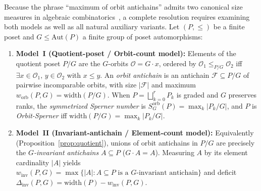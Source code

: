 \documentclass[11pt,a4paper]{article}
\theoremstyle{definition}
\newcommand{\Aut}{\mathrm{Aut}}
\newcommand{\width}{\mathrm{width}}
\newcommand{\worb}{w_{\mathrm{orb}}}
\newcommand{\winv}{w_{\mathrm{inv}}}
\newcommand{\Dinv}{\Delta_{\mathrm{inv}}}
\begin{document}
Because the phrase ``maximum of orbit antichains'' admits two canonical size measures in algebraic combinatorics~\cite{Engel1997,Freese1974,Harper1985,Pouzet1976,Stanley1984}, a complete resolution requires examining both models as well as all natural auxiliary variants. Let $(P,\le)$ be a finite poset and $G \le \Aut(P)$ a finite group of poset automorphisms:
\begin{enumerate}
  \item \textbf{Model~I (Quotient-poset / Orbit-count model):} Elements of the quotient poset $P/G$ are the $G$-orbits $\mathcal{O} = G \cdot x$, ordered by $\mathcal{O}_1 \le_{P/G} \mathcal{O}_2$ iff $\exists x \in \mathcal{O}_1,\, y \in \mathcal{O}_2$ with $x \le y$. An \emph{orbit antichain} is an antichain $\mathcal{F} \subseteq P/G$ of pairwise incomparable orbits, with size $|\mathcal{F}|$ and maximum $\worb(P,G) = \width(P/G)$. When $P = \bigsqcup_{k=0}^r P_k$ is graded and $G$ preserves ranks, the \emph{symmetrized Sperner number} is $S_G^{\mathrm{orb}}(P) = \max_k |P_k/G|$, and $P$ is \emph{Orbit-Sperner} iff $\width(P/G) = \max_k |P_k/G|$.
  \item \textbf{Model~II (Invariant-antichain / Element-count model):} Equivalently (Proposition~\ref{prop:quotient}), unions of orbit antichains in $P/G$ are precisely the \emph{$G$-invariant antichains} $A \subseteq P$ ($G \cdot A = A$). Measuring $A$ by its element cardinality $|A|$ yields $\winv(P,G) = \max\{|A| : A \subseteq P \text{ is a } G\text{-invariant antichain}\}$ and deficit $\Dinv(P,G) = \width(P) - \winv(P,G)$.
\end{enumerate}
\end{document}
